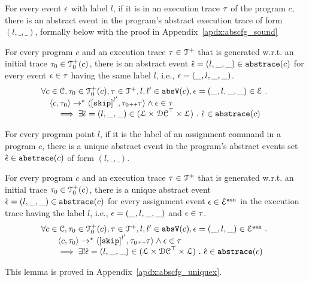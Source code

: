 For every event $\mathtt{\epsilon}$ with label $l$, if it is in an execution trace $\mathtt{\tau}$ of the program $c$, 
 there is an abstract event in the program's abstract execution trace of form $(l, \_, \_)$, formally below
 with the proof in Appendix~\ref{apdx:abscfg_sound}
 \begin{lem}
 \label{lem:abscfg_sound}
 For every program $c$ and
 an execution trace $\mathtt{\tau} \in \mathcal{T}^{+}$ that is generated w.r.t.
 an initial trace $\mathtt{\tau}_0 \in \mathcal{T}^{+}_0(c)$,
 there is an abstract event $\hat{\mathtt{\epsilon}{}} = (l, \_, \_) \in \mathtt{abs}{\mathtt{trace}}(c)$ 
 for every event $\mathtt{\epsilon} \in \mathtt{\tau}$ having the same label $l$, i.e., $\mathtt{\epsilon} = (\_, l, \_, \_)$.
 \[
 \begin{array}{l}
 \forall c \in \cdom, \vtrace_0 \in \ftdom_0(c), \trace \in \ftdom , l, l' \in \absV(c), \event = (\_, l, \_, \_) \in \eventset \st
 \\
 \quad
 \config{{c}, \trace_0} \to^{*} \config{\clabel{\eskip}^{l'}, \trace_0 \tracecat \vtrace} 
 \land \event \in \trace 
 \\
 \qquad \implies \exists \absevent = (l, \_, \_) \in (\ldom\times \dcdom^{\top} \times \ldom) \st 
 \absevent \in \absflow(c)
 \end{array}
 \]
 \end{lem}

For every program point $l$, if it is the label of an assignment command in a program $c$,
there is a unique abstract event in the program's abstract events set $\hat{\mathtt{\epsilon}{}} \in \mathtt{abs}{\mathtt{trace}}(c)$ of form $(l, \_, \_)$. 
\begin{lem}
 \label{lem:abscfg_uniquex}
 For every program $c$ and
 an execution trace $\mathtt{\tau} \in \mathcal{T}^{+}$ that is generated w.r.t.
 an initial trace $\mathtt{\tau}_0 \in \mathcal{T}^{+}_0(c)$,
 there is a unique abstract event $\hat{\mathtt{\epsilon}{}} = (l, \_, \_) \in \mathtt{abs}{\mathtt{trace}}(c)$ 
 for every assignment event $\mathtt{\epsilon} \in \mathcal{E}^{\mathtt{{asn}}}$ in the
 execution trace having the label $l$, i.e., $\mathtt{\epsilon} = (\_, l, \_, \_)$ and $\mathtt{\epsilon} \in \mathtt{\tau}$.
%
\[
 \begin{array}{l}
 \forall c \in \cdom, \vtrace_0 \in \ftdom_0(c), \trace \in \ftdom , l, l' \in \absV(c), \event = (\_, l, \_) \in \eventset^{\asn} \st
 \\
 \qquad \config{{c}, \trace_0} \to^{*} \config{\clabel{\eskip}^{l'}, \trace_0 \tracecat \vtrace} 
 \land \event \in \trace 
 \\
 \qquad \implies \exists! \absevent = (l, \_, \_) \in (\ldom\times \dcdom^{\top} \times \ldom) \st 
 \absevent \in \absflow(c)
\end{array}
\]
\end{lem}
This lemma is proved in Appendix~\ref{apdx:abscfg_uniquex}.

